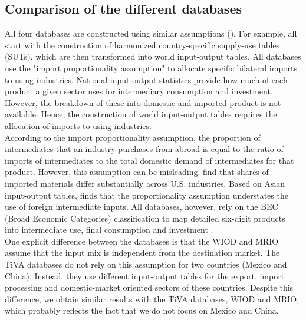 \documentclass[11pt,a4paper]{paper} %
\begin{document}
\subsection{Comparison of the different databases}
All four databases are constructed using similar assumptions (\cite{OECD2011,Timmer2015,OECD2018}).
For example, all start with the construction of harmonized country-specific supply-use tables (SUTs), which are then transformed into world input-output tables.
All databases use the "import proportionality assumption" to allocate specific bilateral imports to using industries.
National input-output statistics provide how much of each product a given sector uses for intermediary consumption and investment. 
However, the breakdown of these into domestic and imported product is not available. 
Hence, the construction of world input-output tables requires the allocation of imports to using industries.\\
According to the import proportionality assumption, the proportion of intermediates that an industry purchases from abroad is equal to the ratio of imports of intermediates to the total domestic demand of intermediates for that product. 
However, this assumption can be misleading. \cite{Feenstra2012} find that shares of imported materials differ substantially across U.S. industries. Based on Asian input-output tables, \cite{Puzzello2012} finds that the proportionality assumption understates the use of foreign intermediate inputs. All databases, however, rely on the BEC (Broad Economic Categories) classification to map detailed six-digit products into intermediate use, final consumption and investment \citep{Dietzenbacher2013}. \\
One explicit difference between the databases is that the WIOD and MRIO assume that the input mix is independent from the destination market. 
The TiVA databases do not rely on this assumption for two countries (Mexico and China). Instead, they use different input-output tables for the export, import processing and domestic-market oriented sectors of these countries. Despite this difference, we obtain similar results with the TiVA databases, WIOD and MRIO, which probably reflects the fact that we do not focus on Mexico and China.\\
\end{document}
